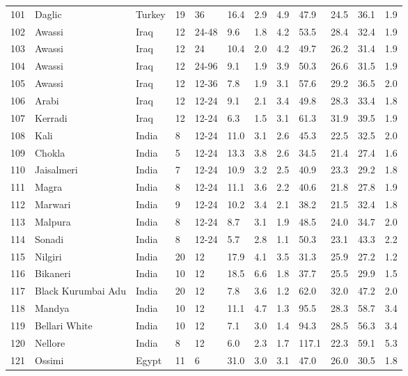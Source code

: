 \begin{center}
\begin{landscape}
\begin{longtable}{|p{0.4in}|p{0.9in}|p{0.7in}|p{0.4in}|p{0.45in}|p{0.45in}|p{0.45in}|p{0.45in}|p{0.45in}|p{0.45in}|p{0.45in}|p{0.45in}|}
 101 &  Daglic &  Turkey & 19 &  36 & 16.4 & 2.9 & 4.9 & 47.9 & 24.5 & 36.1 & 1.9 \\ 
 102 &  Awassi &  Iraq & 12 &  24-48 & 9.6 & 1.8 & 4.2 & 53.5 & 28.4 & 32.4 & 1.9 \\ 
 103 &  Awassi &  Iraq & 12 &  24 & 10.4 & 2.0 & 4.2 & 49.7 & 26.2 & 31.4 & 1.9 \\ 
 104 &  Awassi &  Iraq & 12 &  24-96 & 9.1 & 1.9 & 3.9 & 50.3 & 26.6 & 31.5 & 1.9 \\ 
 105 &  Awassi &  Iraq & 12 &  12-36 & 7.8 & 1.9 & 3.1 & 57.6 & 29.2 & 36.5 & 2.0 \\ 
 106 &  Arabi &  Iraq & 12 &  12-24 & 9.1 & 2.1 & 3.4 & 49.8 & 28.3 & 33.4 & 1.8 \\ 
 107 &  Kerradi &  Iraq & 12 &  12-24 & 6.3 & 1.5 & 3.1 & 61.3 & 31.9 & 39.5 & 1.9 \\ 
 108 &  Kali &  India &  8 &  12-24 & 11.0 & 3.1 & 2.6 & 45.3 & 22.5 & 32.5 & 2.0 \\ 
 109 &  Chokla &  India &  5 &  12-24 & 13.3 & 3.8 & 2.6 & 34.5 & 21.4 & 27.4 & 1.6 \\ 
 110 &  Jaisalmeri &  India &  7 &  12-24 & 10.9 & 3.2 & 2.5 & 40.9 & 23.3 & 29.2 & 1.8 \\ 
 111 &  Magra &  India &  8 &  12-24 & 11.1 & 3.6 & 2.2 & 40.6 & 21.8 & 27.8 & 1.9 \\ 
 112 &  Marwari &  India &  9 &  12-24 & 10.2 & 3.4 & 2.1 & 38.2 & 21.5 & 32.4 & 1.8 \\ 
 113 &  Malpura &  India &  8 &  12-24 & 8.7 & 3.1 & 1.9 & 48.5 & 24.0 & 34.7 & 2.0 \\ 
 114 &  Sonadi &  India &  8 &  12-24 & 5.7 & 2.8 & 1.1 & 50.3 & 23.1 & 43.3 & 2.2 \\ 
 115 &  Nilgiri &  India & 20 &  12 & 17.9 & 4.1 & 3.5 & 31.3 & 25.9 & 27.2 & 1.2 \\ 
 116 &  Bikaneri &  India & 10 &  12 & 18.5 & 6.6 & 1.8 & 37.7 & 25.5 & 29.9 & 1.5 \\ 
 117 &  Black Kurumbai Adu &  India & 20 &  12 & 7.8 & 3.6 & 1.2 & 62.0 & 32.0 & 47.2 & 2.0 \\ 
 118 &  Mandya &  India & 10 &  12 & 11.1 & 4.7 & 1.3 & 95.5 & 28.3 & 58.7 & 3.4 \\ 
 119 &  Bellari White &  India & 10 &  12 & 7.1 & 3.0 & 1.4 & 94.3 & 28.5 & 56.3 & 3.4 \\ 
 120 &  Nellore &  India &  8 &  12 & 6.0 & 2.3 & 1.7 & 117.1 & 22.3 & 59.1 & 5.3 \\ 
 121 &  Ossimi &  Egypt & 11 &  6 & 31.0 & 3.0 & 3.1 & 47.0 & 26.0 & 30.5 & 1.8 \\ 

\end{longtable}
\end{landscape}
\end{center}
